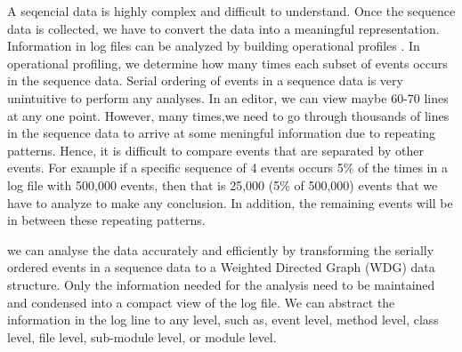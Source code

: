 A seqencial data is highly complex and difficult to understand. Once the sequence data is collected, we have to convert the data into a meaningful representation. Information in log files can be analyzed by building operational profiles \cite{hmf08}\cite{nwv09}. In operational profiling, we determine how many times each subset of events occurs in the sequence data. Serial ordering of events in a sequence data is very unintuitive to perform any analyses. In an editor, we can view maybe 60-70 lines at any one point. However, many times,we need to go through thousands of lines in the sequence data to arrive at some meningful information due to repeating patterns. Hence, it is difficult to compare events that are separated by other events. For example if a specific sequence of 4 events occurs 5\% of the times in a log file with 500,000 events, then that is 25,000 (5\% of 500,000) events that we have to analyze to make any conclusion. In addition, the remaining events will be in between these repeating patterns.

we can analyse the data accurately and efficiently by transforming the serially ordered events in a sequence data to a Weighted Directed Graph (WDG) data structure. Only the information needed for the analysis need to be maintained and condensed into a compact view of the log file. We can abstract the information in the log line to any level, such as, event level, method level, class level, file level, sub-module level, or module level.

